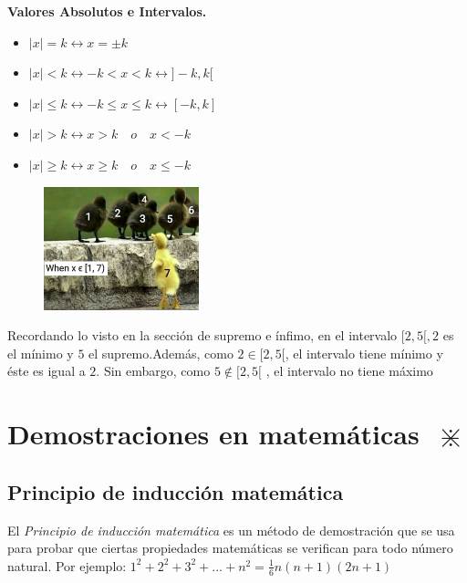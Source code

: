 		\textbf{Valores Absolutos e Intervalos.}
		\begin{multicols}{2}
		\begin{itemize}
			\item $|x|=k \longleftrightarrow x=\pm k$
			\item $|x|<k \longleftrightarrow -k<x<k \longleftrightarrow ]-k,k[$
			\item $|x|\le k \longleftrightarrow -k\le x\le k \longleftrightarrow [-k,k]$
			\item $|x|> k \longleftrightarrow x>k\quad o \quad x<-k$
			\item $|x|\ge  k \longleftrightarrow x\ge k\quad o \quad x\le -k$
		\end{itemize}
		\begin{figure}[H]
			\centering
			\includegraphics[width=0.4\textwidth]{imagenes/imagenes01/xiste01.png}
		\end{figure}
		\end{multicols}
		
		Recordando lo visto en la sección de supremo e ínfimo, en el intervalo $[2,5[, 2$ es el mínimo y $5$ el supremo.Además, como $2 \in [2,5[$, el intervalo tiene mínimo y éste es igual a $2$. Sin embargo, como $5 \notin [2,5[$ , el intervalo no tiene máximo
		
		\section{ Demostraciones en matemáticas $\; \divideontimes$} \label{demostraciones}
		
		\subsection{Principio de inducción matemática}
		\label{subsec:inducción}
		
		El \emph{Principio de inducción matemática} es un método de demostración que se usa para probar que ciertas propiedades matemáticas se verifican para todo número natural. Por ejemplo:
		$1^2+2^2+3^2+...+n^2=\frac 1 6 n (n+1)(2n+1)$
		
